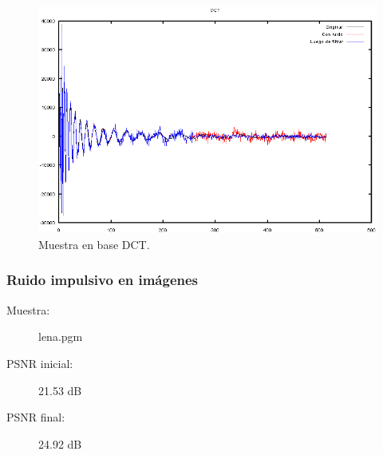 \documentclass[a4paper,10pt,twoside]{article}
\begin{document}
\begin{figure}[H]
  \centering
  \includegraphics[width=15cm]{graficos/dopp_impulsivo_atenuar_dct.png} 
  \caption{Muestra en base DCT.}
\end{figure}


\subsubsection{Ruido impulsivo en imágenes}

\begin{description}
  \item[Muestra:] lena.pgm
  \item[PSNR inicial:] 21.53 dB
  \item[PSNR final:] 24.92 dB
\end{description}
\end{document}
